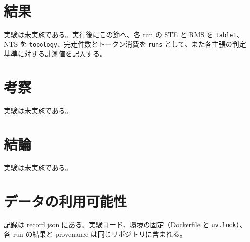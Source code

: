 \documentclass{article}
\providecommand{\airasrecordlink}[1]{#1}
\begin{document}

\section{結果}
\label{sec:results}
実験は未実施である。実行後にこの節へ、各 run の STE と RMS を \texttt{table1}、NTS を \texttt{topology}、完走件数とトークン消費を \texttt{runs} として、また各主張の判定基準に対する計測値を記入する。

\section{考察}
\label{sec:discussion}
実験は未実施である。

\section{結論}
\label{sec:conclusion}
実験は未実施である。

\section*{データの利用可能性}
記録は \airasrecordlink{record.json} にある。実験コード、環境の固定（Dockerfile と \texttt{uv.lock}）、各 run の結果と provenance は同じリポジトリに含まれる。



\end{document}
